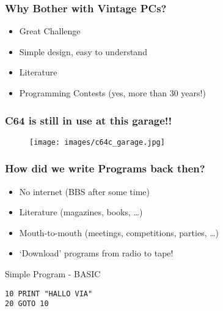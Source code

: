 \documentclass[aspectratio=43]{uva-inf-presentation}
\begin{document}

\begin{frame}
\frametitle{Why Bother with Vintage PCs?}

\begin{itemize}
\item Great Challenge
\item Simple design, easy to understand
\item Literature
\item Programming Contests (yes, more than 30 years!)
\end{itemize}

\end{frame}


\begin{frame}
\frametitle{C64 is still in use at this garage!!}

\begin{figure}
\texttt{[image: images/c64c\_garage.jpg]}
\end{figure}

\end{frame}


\begin{frame}
\frametitle{How did we write Programs back then?}

\begin{itemize}
\item No internet (BBS after some time)
\item Literature (magazines, books, \dots)
\item Mouth-to-mouth (meetings, competitions, parties, \dots)
\item `Download' programs from radio to tape!
\end{itemize}

\end{frame}


\begin{frame}[fragile]{Simple Program - BASIC}

\begin{lstlisting}
10 PRINT "HALLO VIA"
20 GOTO 10
\end{lstlisting}

\end{frame}
\end{document}
